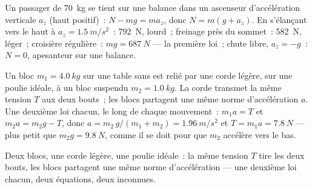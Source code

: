 \begin{example}[L'ascenseur]\label{ex:g12:newtons-laws:elevator}
Un passager de \qty{70}{kg} se tient sur une balance dans un ascenseur
d'accélération verticale $a_z$ (haut positif)~: $N - mg = ma_z$, donc
$N = m(g + a_z)$. En s'élançant vers le haut à
$a_z = \qty{1.5}{m/s^2}$~: \qty{792}{N}, lourd~; freinage près du
sommet~: \qty{582}{N}, léger~; croisière régulière~:
$mg = \qty{687}{N}$ --- la première loi~; chute libre, $a_z = -g$~:
$N = 0$, apesanteur sur une balance.
\end{example}

\begin{example}\label{ex:g12:newtons-laws:pulley}
Un bloc $m_1 = \qty{4.0}{kg}$ sur une table sans  est relié
par une corde légère, sur une poulie idéale, à un bloc suspendu
$m_2 = \qty{1.0}{kg}$. La corde transmet la même
tension $T$ aux deux bouts~; les blocs partagent une même
norme d'accélération $a$. Une deuxième loi chacun, le long de chaque
mouvement~: $m_1 a = T$ et $m_2 a = m_2 g - T$, donc
$a = m_2\,g/(m_1 + m_2) = \qty{1.96}{m/s^2}$ et
$T = m_1 a = \qty{7.8}{N}$ --- plus petit que $m_2 g = \qty{9.8}{N}$,
comme il se doit pour que $m_2$ accélère vers le bas.
\end{example}


\begin{omfigure}

{\small Deux blocs, une corde légère, une poulie idéale~: la même
tension $T$ tire les deux bouts, les blocs partagent une
même norme d'accélération --- une deuxième loi chacun, deux équations,
deux inconnues.}
\end{omfigure}

